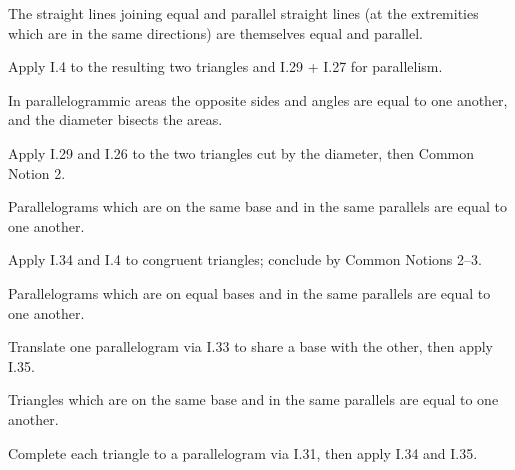 \begin{claim}
\label{prop:I.33}
The straight lines joining equal and parallel straight lines (at the
extremities which are in the same directions) are themselves equal
and parallel.
\end{claim}
\begin{evidence}[Proof of I.33]
\label{ev:I.33}
Apply I.4 to the resulting two triangles and I.29 + I.27 for
parallelism.
\end{evidence}

\begin{claim}
\label{prop:I.34}
In parallelogrammic areas the opposite sides and angles are equal to
one another, and the diameter bisects the areas.
\end{claim}
\begin{evidence}[Proof of I.34]
\label{ev:I.34}
Apply I.29 and I.26 to the two triangles cut by the diameter, then
Common Notion 2.
\end{evidence}

\begin{claim}
\label{prop:I.35}
Parallelograms which are on the same base and in the same parallels
are equal to one another.
\end{claim}
\begin{evidence}[Proof of I.35]
\label{ev:I.35}
Apply I.34 and I.4 to congruent triangles; conclude by Common Notions
2--3.
\end{evidence}

\begin{claim}
\label{prop:I.36}
Parallelograms which are on equal bases and in the same parallels are
equal to one another.
\end{claim}
\begin{evidence}[Proof of I.36]
\label{ev:I.36}
Translate one parallelogram via I.33 to share a base with the other,
then apply I.35.
\end{evidence}

\begin{claim}
\label{prop:I.37}
Triangles which are on the same base and in the same parallels are
equal to one another.
\end{claim}
\begin{evidence}[Proof of I.37]
\label{ev:I.37}
Complete each triangle to a parallelogram via I.31, then apply I.34
and I.35.
\end{evidence}

